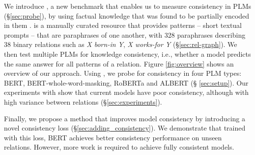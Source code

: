 We introduce \resource{}, a new benchmark that enables us to measure consistency in PLMs (\S \ref{sec:probe}), by using factual knowledge that was found to be partially encoded in them \cite{lama,alpaqa}.
\resource{} is a manually curated resource
that provides patterns -- short textual prompts -- that are paraphrases of one another, with 328 paraphrases describing 38 binary relations such as \textit{X born-in Y}, \textit{X works-for Y} (\S \ref{sec:rel-graph}).
We then test multiple PLMs for knowledge consistency, i.e., whether
a model predicts the same answer for all patterns of a relation.
Figure \ref{fig:overview} shows an overview of our approach.
Using \resource{}, we probe for consistency in four PLM
types: BERT, BERT-whole-word-masking, RoBERTa and ALBERT (\S
\ref{sec:setup}).
Our experiments with \resource{} show that
current models have poor consistency, although with high variance between relations (\S \ref{sec:experiments}). 

Finally, we propose a method that improves model consistency
by introducing a novel consistency loss
(\S \ref{sec:adding_consistency}). We demonstrate that
trained with this loss, BERT achieves better consistency performance on unseen relations. However, more work is required to achieve fully consistent models.
